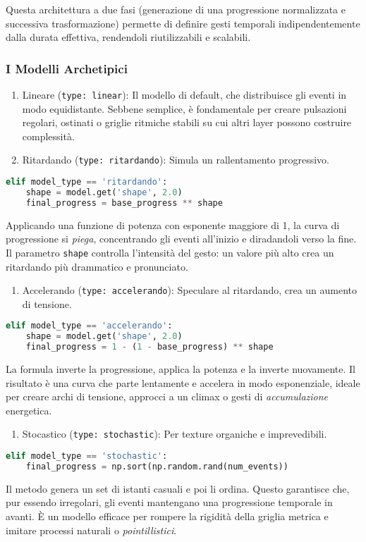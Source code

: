 Questa architettura a due fasi (generazione di una progressione normalizzata e successiva trasformazione) permette di definire gesti temporali indipendentemente dalla durata effettiva, rendendoli riutilizzabili e scalabili.
\subsubsection{I Modelli Archetipici}
\begin{enumerate}
    \item Lineare (\texttt{type: linear}): Il modello di default, che distribuisce gli eventi in modo equidistante. Sebbene semplice, è fondamentale per creare pulsazioni regolari, ostinati o griglie ritmiche stabili su cui altri layer possono costruire complessità.
    \item Ritardando (\texttt{type: ritardando}): Simula un rallentamento progressivo.
\end{enumerate}
\begin{lstlisting}[language=Python]
elif model_type == 'ritardando':
    shape = model.get('shape', 2.0)
    final_progress = base_progress ** shape
\end{lstlisting}
    Applicando una funzione di potenza con esponente maggiore di 1, la curva di progressione si \textit{piega}, concentrando gli eventi all'inizio e diradandoli verso la fine. Il parametro \texttt{shape} controlla l'intensità del gesto: un valore più alto crea un ritardando più drammatico e pronunciato.

\begin{enumerate}
    \item Accelerando (\texttt{type: accelerando}): Speculare al ritardando, crea un aumento di tensione.
\end{enumerate}
\begin{lstlisting}[language=Python]
elif model_type == 'accelerando':
    shape = model.get('shape', 2.0)
    final_progress = 1 - (1 - base_progress) ** shape
\end{lstlisting}
    La formula inverte la progressione, applica la potenza e la inverte nuovamente. Il risultato è una curva che parte lentamente e accelera in modo esponenziale, ideale per creare archi di tensione, approcci a un climax o gesti di \textit{accumulazione} energetica.

\begin{enumerate}
    \item Stocastico (\texttt{type: stochastic}): Per texture organiche e imprevedibili.
\end{enumerate}
\begin{lstlisting}[language=Python]
elif model_type == 'stochastic':
    final_progress = np.sort(np.random.rand(num_events))
\end{lstlisting}
    Il metodo genera un set di istanti casuali e poi li ordina. Questo garantisce che, pur essendo irregolari, gli eventi mantengano una progressione temporale in avanti. È un modello efficace per rompere la rigidità della griglia metrica e imitare processi naturali o \textit{pointillistici}.

